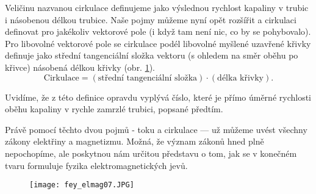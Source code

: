     Veličinu nazvanou cirkulace definujeme jako výslednou rychlost kapaliny v trubic i násobenou délkou 
    trubice. Naše pojmy můžeme nyní opět rozšířit a cirkulaci definovat pro jakékoliv vektorové pole (i 
    když tam není nic, co by se pohybovalo). Pro libovolné vektorové pole se cirkulace podél libovolné 
    myšlené uzavřené křivky definuje jako střední tangenciální složka vektoru (s ohledem na směr oběhu po 
    křivce) násobená délkou křivky (obr. \ref{fyz:fig_fey_elmag07}).      
    \begin{equation}\label{FYZ:eq_fey_elmag05}
      \text{Cirkulace} = (\text{střední tangenciální složka})\cdot(\text{délka křivky}).
    \end{equation}
    
    Uvidíme, že z této definice opravdu vyplývá číslo, které je přímo úměrné rychlosti oběhu kapaliny v 
    rychle zamrzlé trubici, popsané předtím.
    
    Právě pomocí těchto dvou pojmů - toku a cirkulace — už můžeme uvést všechny zákony elektřiny a
    magnetizmu. Možná, že význam zákonů hned plně nepochopíme, ale poskytnou nám určitou představu o tom, 
    jak se v konečném tvaru formuluje fyzika elektromagnetických jevů.

    \begin{figure}
      \centering
      \texttt{[image: fey\_elmag07.JPG]}
      \label{fyz:fig_fey_elmag07}
    \end{figure}
   
